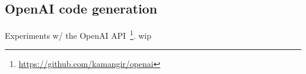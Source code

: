 \subsection{OpenAI code generation}

Experiments w/ the OpenAI API~\footnote{\url{https://github.com/kamangir/openai}}. wip